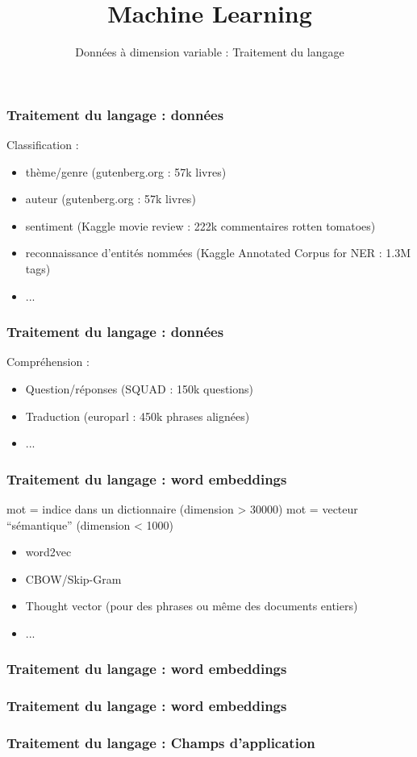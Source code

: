 \documentclass{formation}
\title{Machine Learning}
\subtitle{Données à dimension variable : Traitement du langage}
\begin{document}
\maketitle

\begin{frame}
  \frametitle{Traitement du langage : données}
  Classification :
  \begin{itemize}
  \item thème/genre (gutenberg.org : 57k livres)
  \item auteur (gutenberg.org : 57k livres)
  \item sentiment (Kaggle movie review : 222k commentaires rotten tomatoes)
  \item reconnaissance d'entités nommées (Kaggle Annotated Corpus for NER : 1.3M tags)
  \item ...
  \end{itemize}
\end{frame}

\begin{frame}
  \frametitle{Traitement du langage : données}
  Compréhension :
  \begin{itemize}
  \item Question/réponses (SQUAD : 150k questions)
  \item Traduction (europarl : 450k phrases alignées)
  \item ...
  \end{itemize}
\end{frame}

\begin{frame}
  \frametitle{Traitement du langage : word embeddings} 
  mot = indice dans un dictionnaire (dimension > 30000)
  \newline
  mot = vecteur ``sémantique'' (dimension < 1000) 
  \begin{itemize}
  \item word2vec
  \item CBOW/Skip-Gram
  \item Thought vector (pour des phrases ou même des documents entiers)
  \item ...
  \end{itemize}
\end{frame}

\begin{frame}
  \frametitle{Traitement du langage : word embeddings} 
\end{frame}

\begin{frame}
  \frametitle{Traitement du langage : word embeddings} 
  \begin{center}
    \href{https://projector.tensorflow.org/}{}
  \end{center}
\end{frame}

\begin{frame}
  \frametitle{Traitement du langage : Champs d'application}
\end{frame}
\end{document}
